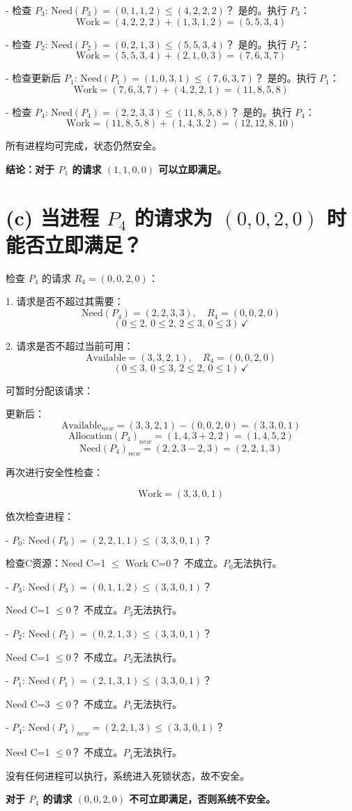 \documentclass[UTF8]{homework}
\begin{document}
\begin{homeworkProblem}
- 检查 $P_3$: Need$(P_3)=(0,1,1,2) \leq (4,2,2,2)$？ 是的。执行 $P_3$：
  \[
  \text{Work}=(4,2,2,2)+(1,3,1,2)=(5,5,3,4)
  \]

- 检查 $P_2$: Need$(P_2)=(0,2,1,3)\leq(5,5,3,4)$？ 是的。执行 $P_2$：
  \[
  \text{Work}=(5,5,3,4)+(2,1,0,3)=(7,6,3,7)
  \]

- 检查更新后 $P_1$: Need$(P_1)=(1,0,3,1)\leq(7,6,3,7)$？ 是的。执行 $P_1$：
  \[
  \text{Work}=(7,6,3,7)+(4,2,2,1)=(11,8,5,8)
  \]

- 检查 $P_4$: Need$(P_4)=(2,2,3,3)\leq(11,8,5,8)$？ 是的。执行 $P_4$：
  \[
  \text{Work}=(11,8,5,8)+(1,4,3,2)=(12,12,8,10)
  \]

所有进程均可完成，状态仍然安全。

\textbf{结论：对于 $P_1$ 的请求 $(1,1,0,0)$ 可以立即满足。}

\section*{(c) 当进程 $P_4$ 的请求为 $(0,0,2,0)$ 时能否立即满足？}

检查 $P_4$ 的请求 $R_4=(0,0,2,0)$：

1. 请求是否不超过其需要：
   \[
   \text{Need}(P_4)=(2,2,3,3), \quad R_4=(0,0,2,0)
   \]
   \[
   (0 \leq 2,\,0 \leq 2,\,2 \leq 3,\,0 \leq 3)\, \checkmark
   \]

2. 请求是否不超过当前可用：
   \[
   \text{Available}=(3,3,2,1), \quad R_4=(0,0,2,0)
   \]
   \[
   (0 \leq 3,\,0 \leq 3,\,2 \leq 2,\,0 \leq 1) \, \checkmark
   \]

可暂时分配该请求：

更新后：
\[
\text{Available}_{new}=(3,3,2,1)-(0,0,2,0)=(3,3,0,1)
\]
\[
\text{Allocation}(P_4)_{new}=(1,4,3+2,2)=(1,4,5,2)
\]
\[
\text{Need}(P_4)_{new}=(2,2,3-2,3)=(2,2,1,3)
\]

再次进行安全性检查：

\[
\text{Work}=(3,3,0,1)
\]

依次检查进程：

- $P_0$: Need$(P_0)=(2,2,1,1)\leq(3,3,0,1)$？
  
  检查C资源：Need C=1 $\leq$ Work C=0？ 不成立。$P_0$无法执行。

- $P_3$: Need$(P_3)=(0,1,1,2)\leq(3,3,0,1)$？
  
  Need C=1 $\leq$0？ 不成立。$P_3$无法执行。

- $P_2$: Need$(P_2)=(0,2,1,3)\leq(3,3,0,1)$？
  
  Need C=1 $\leq$0？ 不成立。$P_2$无法执行。

- $P_1$: Need$(P_1)=(2,1,3,1)\leq(3,3,0,1)$？
  
  Need C=3 $\leq$0？ 不成立。$P_1$无法执行。

- $P_4$: Need$(P_4)_{new}=(2,2,1,3)\leq(3,3,0,1)$？
  
  Need C=1 $\leq$0？ 不成立。$P_4$无法执行。

没有任何进程可以执行，系统进入死锁状态，故不安全。

\textbf{对于 $P_4$ 的请求 $(0,0,2,0)$ 不可立即满足，否则系统不安全。}



\end{homeworkProblem}



\end{document}
